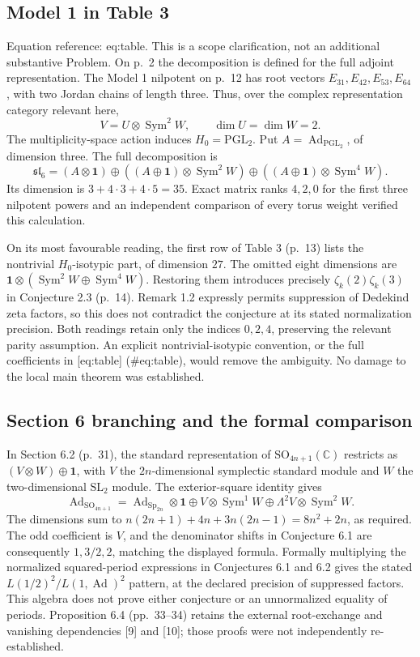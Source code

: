 \documentclass[10pt]{article}
\begin{document}
\subsection*{Model 1 in Table 3}
Equation reference: eq:table. This is a scope clarification, not an additional substantive Problem. On p. 2 the decomposition is defined for the full adjoint representation. The Model 1 nilpotent on p. 12 has root vectors \(E_{31},E_{42},E_{53},E_{64}\), with two Jordan chains of length three. Thus, over the complex representation category relevant here, \[V=U\otimes\operatorname{Sym}^2W,\qquad \dim U=\dim W=2.\] The multiplicity-space action induces \(H_0=\mathrm{PGL}_2\). Put \(A=\operatorname{Ad}_{\mathrm{PGL}_2}\), of dimension three. The full decomposition is \[
 \mathfrak{sl}_6
 =(A\otimes\mathbf1)
 \oplus((A\oplus\mathbf1)\otimes\operatorname{Sym}^2W)
 \oplus((A\oplus\mathbf1)\otimes\operatorname{Sym}^4W).\] Its dimension is \(3+4\cdot3+4\cdot5=35\). Exact matrix ranks \(4,2,0\) for the first three nilpotent powers and an independent comparison of every torus weight verified this calculation.\par
On its most favourable reading, the first row of Table 3 (p. 13) lists the nontrivial \(H_0\)-isotypic part, of dimension \(27\). The omitted eight dimensions are \(\mathbf1\otimes(\operatorname{Sym}^2W\oplus\operatorname{Sym}^4W)\). Restoring them introduces precisely \(\zeta_k(2)\zeta_k(3)\) in Conjecture 2.3 (p. 14). Remark 1.2 expressly permits suppression of Dedekind zeta factors, so this does not contradict the conjecture at its stated normalization precision. Both readings retain only the indices \(0,2,4\), preserving the relevant parity assumption. An explicit nontrivial-isotypic convention, or the full coefficients in [eq:table] (\#eq:table), would remove the ambiguity. No damage to the local main theorem was established.\par
\subsection*{Section 6 branching and the formal comparison}
In Section 6.2 (p. 31), the standard representation of \(\mathrm{SO}_{4n+1}(\mathbb C)\) restricts as \((V\otimes W)\oplus\mathbf1\), with \(V\) the \(2n\)-dimensional symplectic standard module and \(W\) the two-dimensional \(\mathrm{SL}_2\) module. The exterior-square identity gives \[\operatorname{Ad}_{\mathrm{SO}_{4n+1}}
 =\operatorname{Ad}_{\mathrm{Sp}_{2n}}\otimes\mathbf1
 \oplus V\otimes\operatorname{Sym}^1W
 \oplus\Lambda^2V\otimes\operatorname{Sym}^2W.\] The dimensions sum to \(n(2n+1)+4n+3n(2n-1)=8n^2+2n\), as required. The odd coefficient is \(V\), and the denominator shifts in Conjecture 6.1 are consequently \(1,3/2,2\), matching the displayed formula. Formally multiplying the normalized squared-period expressions in Conjectures 6.1 and 6.2 gives the stated \(L(1/2)^2/L(1,\operatorname{Ad})^2\) pattern, at the declared precision of suppressed factors. This algebra does not prove either conjecture or an unnormalized equality of periods. Proposition 6.4 (pp. 33–34) retains the external root-exchange and vanishing dependencies [9] and [10]; those proofs were not independently re-established.\par
\end{document}
